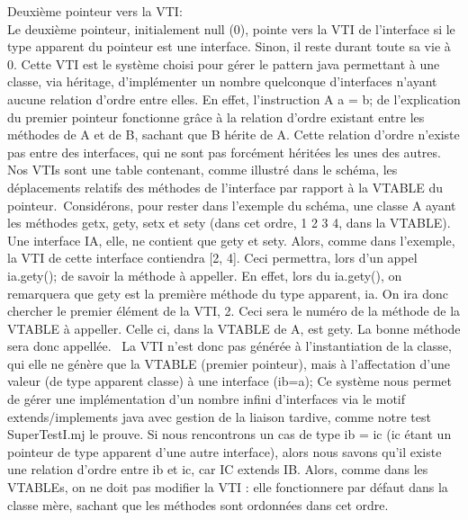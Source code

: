 Deuxième pointeur vers la VTI:\\
Le deuxième pointeur, initialement null (0), pointe vers la VTI de l'interface
si le type apparent du pointeur est une interface. Sinon, il reste durant toute sa vie à 0.
Cette VTI est le système choisi pour gérer le pattern java permettant à une classe, via héritage,
d'implémenter un nombre quelconque d'interfaces n'ayant aucune relation d'ordre
entre elles. En effet, l'instruction A a = b; de l'explication du premier
pointeur fonctionne grâce à la relation d'ordre existant entre les méthodes de A
et de B, sachant que B hérite de A. Cette relation d'ordre n'existe pas entre
des interfaces, qui ne sont pas forcément héritées les unes des autres.
Nos VTIs sont une table contenant, comme illustré dans le schéma, les déplacements
relatifs des méthodes de l'interface par rapport à la VTABLE du pointeur.\
Considérons, pour rester dans l'exemple du schéma, une classe A ayant les
méthodes getx, gety, setx et sety (dans cet ordre, 1 2 3 4, dans la VTABLE). Une
interface IA, elle, ne contient que gety et sety. Alors, comme dans l'exemple,
la VTI de cette interface contiendra [2, 4]. Ceci permettra, lors d'un appel
ia.gety(); de savoir la méthode à appeller. En effet, lors du ia.gety(), on
remarquera que gety est la première méthode du type apparent, ia. On ira donc
chercher le premier élément de la VTI, 2. Ceci sera le numéro de la méthode de
la VTABLE à appeller. Celle ci, dans la VTABLE de A, est gety. La bonne méthode
sera donc appellée. \
La VTI n'est donc pas générée à l'instantiation de la classe, qui elle ne génère
que la VTABLE (premier pointeur), mais à l'affectation d'une valeur (de type
apparent classe) à une interface (ib=a); Ce système nous permet de gérer une
implémentation d'un nombre infini d'interfaces via le motif extends/implements
java avec gestion de la liaison tardive, comme notre test SuperTestI.mj le
prouve. Si nous rencontrons un cas de type ib = ic (ic étant un pointeur de type apparent
d'une autre interface), alors nous savons qu'il existe une relation d'ordre entre ib et ic, 
car IC extends IB. Alors, comme dans les VTABLEs, on ne doit pas modifier la VTI
: elle fonctionnere par défaut dans la classe mère, sachant que les méthodes
sont ordonnées dans cet ordre.


